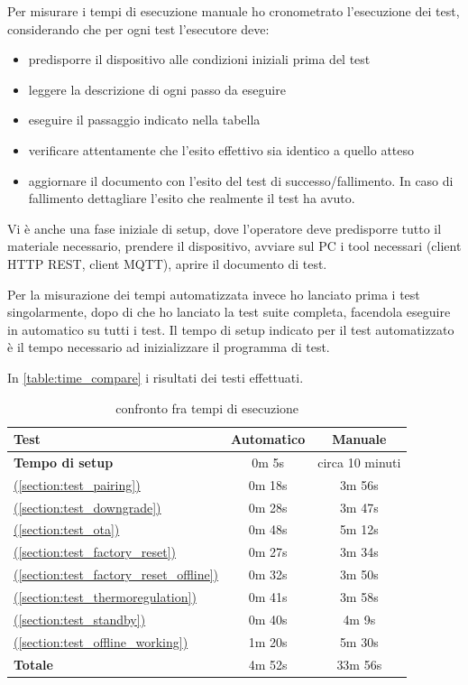 \documentclass[12pt,a4paper,twoside,titlepage]{book}
\newcommand*{\fullref}[1]{\hyperref[{#1}]{\nameref*{#1} (\ref*{#1})}}
\begin{document}
Per misurare i tempi di esecuzione manuale ho cronometrato l'esecuzione dei test, considerando che 
per ogni test l'esecutore deve:
\begin{itemize}
    \item predisporre il dispositivo alle condizioni iniziali prima del test
    \item leggere la descrizione di ogni passo da eseguire
    \item eseguire il passaggio indicato nella tabella 
    \item verificare attentamente che l'esito effettivo sia identico a quello atteso 
    \item aggiornare il documento con l'esito del test di successo/fallimento. In caso di fallimento dettagliare 
        l'esito che realmente il test ha avuto. 
\end{itemize}

Vi è anche una fase iniziale di setup, dove l'operatore deve predisporre tutto il materiale necessario, 
prendere il dispositivo, avviare sul PC i tool necessari (client HTTP REST, client MQTT), aprire il documento 
di test. 

Per la misurazione dei tempi automatizzata invece ho lanciato prima i test singolarmente, dopo di che ho lanciato 
la test suite completa, facendola eseguire in automatico su tutti i test. Il tempo di setup indicato per il test 
automatizzato è il tempo necessario ad inizializzare il programma di test. 

In \autoref{table:time_compare} i risultati dei testi effettuati.

\begin{table}
    \centering
    \begin{tabular}{| l | c | c |}
        \hline
        \textbf{Test} & \textbf{Automatico} & \textbf{Manuale} \\ \hline
        \textbf{Tempo di setup} & 0m 5s & circa 10 minuti \\\hline
        \fullref{section:test_pairing} & 0m 18s & 3m 56s \\ \hline
        \fullref{section:test_downgrade} & 0m 28s & 3m 47s \\ \hline
        \fullref{section:test_ota} & 0m 48s & 5m 12s \\ \hline
        \fullref{section:test_factory_reset} & 0m 27s & 3m 34s \\ \hline
        \fullref{section:test_factory_reset_offline} & 0m 32s & 3m 50s \\ \hline 
        \fullref{section:test_thermoregulation} & 0m 41s & 3m 58s \\ \hline 
        \fullref{section:test_standby} & 0m 40s & 4m 9s \\ \hline 
        \fullref{section:test_offline_working} & 1m 20s & 5m 30s \\ \hline 
        \textbf{Totale} & 4m 52s\footnotemark & 33m 56s \\ \hline
    \end{tabular}
    \caption{confronto fra tempi di esecuzione}
    \label{table:time_compare}
\end{table}
\end{document}
